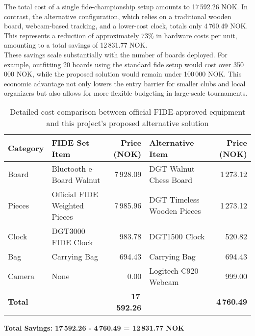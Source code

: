 The total cost of a single \gls{fide}-championship setup amounts to 17\,592.26 NOK. In contrast, the alternative configuration, which relies on a traditional wooden board, webcam-based tracking, and a lower-cost clock, totals only 4\,760.49 NOK. This represents a reduction of approximately 73\% in hardware costs per unit, amounting to a total savings of 12\,831.77 NOK. \\

These savings scale substantially with the number of boards deployed. For example, outfitting 20 boards using the standard \gls{fide} setup would cost over 350\,000 NOK, while the proposed solution would remain under 100\,000 NOK. This economic advantage not only lowers the entry barrier for smaller clubs and local organizers but also allows for more flexible budgeting in large-scale tournaments. \\

\begin{table}[h!]
\centering
\caption[Detailed cost comparison]{Detailed cost comparison between official FIDE-approved equipment and this project's proposed alternative solution \cite{dgtshop:prices}}
\label{tab:detailed-price-comparison}
\begin{tabular}{lL{4cm}rL{4cm}r}
\toprule
\textbf{Category} & \textbf{FIDE Set Item} & \textbf{Price (NOK)} & \textbf{Alternative Item} & \textbf{Price (NOK)} \\
\midrule
Board & Bluetooth e-Board Walnut & 7\,928.09 & DGT Walnut Chess Board & 1\,273.12 \\
Pieces & Official FIDE Weighted Pieces & 7\,985.96 & DGT Timeless Wooden Pieces & 1\,273.12 \\
Clock & DGT3000 FIDE Clock & 983.78 & DGT1500 Clock & 520.82 \\
Bag & Carrying Bag & 694.43 & Carrying Bag & 694.43 \\
Camera & None & 0.00 & Logitech C920 Webcam & 999.00 \\
\midrule
\textbf{Total} & & \textbf{17\,592.26} & & \textbf{4\,760.49} \\
\bottomrule
\end{tabular}
\vspace{0.3cm}

\textbf{Total Savings: 17\,592.26 - 4\,760.49 = 12\,831.77 NOK}
\end{table}

